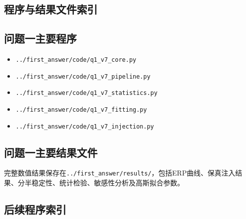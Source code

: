 \clearpage
\begin{appendices}

\section{程序与结果文件索引}

\subsection{问题一主要程序}

\begin{itemize}
    \item \texttt{../first\_answer/code/q1\_v7\_core.py}
    \item \texttt{../first\_answer/code/q1\_v7\_pipeline.py}
    \item \texttt{../first\_answer/code/q1\_v7\_statistics.py}
    \item \texttt{../first\_answer/code/q1\_v7\_fitting.py}
    \item \texttt{../first\_answer/code/q1\_v7\_injection.py}
\end{itemize}

\subsection{问题一主要结果文件}

完整数值结果保存在\texttt{../first\_answer/results/}，包括ERP曲线、保真注入结果、分半稳定性、统计检验、敏感性分析及高斯拟合参数。

\subsection{后续程序索引}


\end{appendices}

